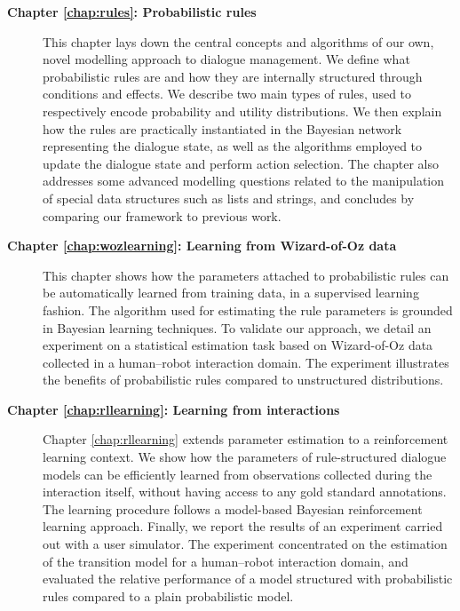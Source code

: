 \begin{description}
  \item[\textbf{Chapter \ref{chap:rules}: Probabilistic rules}] \hfill \vspace{2mm}
 
  This chapter lays down the central concepts and algorithms of our own, novel modelling approach to dialogue management. We define what probabilistic rules are and how they are internally structured through conditions and effects.  We describe two main types of rules, used to respectively encode probability and utility distributions. We then explain how the rules are practically instantiated in the Bayesian network representing the dialogue state, as well as the algorithms employed to update the dialogue state and perform action selection. The chapter also addresses some advanced modelling questions related to the manipulation of special data structures such as lists and strings, and concludes by comparing our framework to previous work. \vspace{2mm}
  
  \item[\textbf{Chapter \ref{chap:wozlearning}: Learning from Wizard-of-Oz data}] \hfill  \vspace{2mm}
  
 This chapter shows how the parameters attached to probabilistic rules can be automatically learned from training data, in a supervised learning fashion. The algorithm used for estimating the rule parameters is grounded in Bayesian learning techniques.  To validate our approach, we detail an experiment on a statistical estimation task based on Wizard-of-Oz data collected in a human--robot interaction domain.  The experiment illustrates the benefits of probabilistic rules compared to unstructured distributions.  \vspace{2mm}

\item [\textbf{Chapter \ref{chap:rllearning}: Learning from interactions}] \hfill  \vspace{2mm}

Chapter \ref{chap:rllearning} extends parameter estimation to a reinforcement learning context.  We show how the parameters of rule-structured dialogue models can be efficiently learned from observations collected during the interaction itself, without having access to any gold standard annotations.  The learning procedure follows a model-based Bayesian reinforcement learning approach. Finally, we report the results of an experiment carried out with a user simulator.  The experiment concentrated on the estimation of the transition model for a human--robot interaction domain, and evaluated the relative performance of a model structured with probabilistic rules compared to a plain probabilistic model.   \vspace{2mm}



\end{description}
